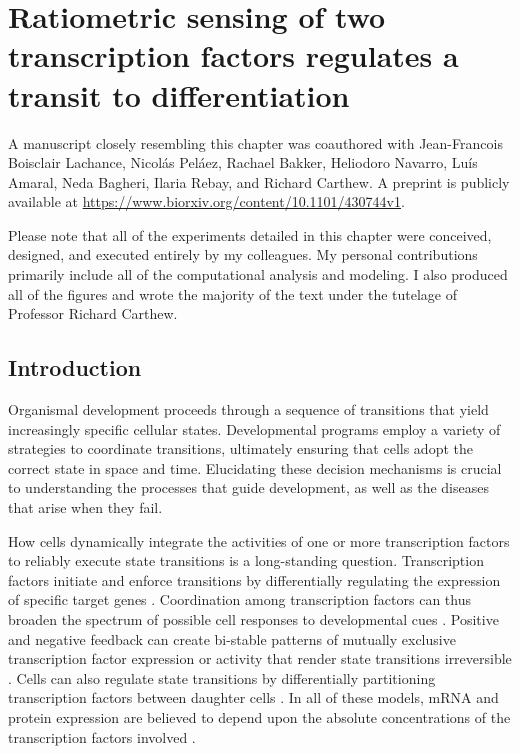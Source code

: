 \graphicspath{ {figures/ratio/} }


\chapter{Ratiometric sensing of two transcription factors regulates a transit to differentiation}
\label{ch:ratio}

A manuscript closely resembling this chapter was coauthored with Jean-Francois Boisclair Lachance, Nicol\'{a}s Pel\'{a}ez, Rachael Bakker, Heliodoro Navarro, Lu\'{i}s Amaral, Neda Bagheri, Ilaria Rebay, and Richard Carthew. A preprint is publicly available at \url{https://www.biorxiv.org/content/10.1101/430744v1}.

Please note that all of the experiments detailed in this chapter were conceived, designed, and executed entirely by my colleagues. My personal contributions primarily include all of the computational analysis and modeling. I also produced all of the figures and wrote the majority of the text under the tutelage of Professor Richard Carthew.

\section{Introduction}

Organismal development proceeds through a sequence of transitions that yield increasingly specific cellular states. Developmental programs employ a variety of strategies to coordinate transitions, ultimately ensuring that cells adopt the correct state in space and time. Elucidating these decision mechanisms is crucial to understanding the processes that guide development, as well as the diseases that arise when they fail.

How cells dynamically integrate the activities of one or more transcription factors to reliably execute state transitions is a long-standing question. Transcription factors initiate and enforce transitions by differentially regulating the expression of specific target genes \cite{Zheng1997,Ducy1997,McGhee2009}. Coordination among transcription factors can thus broaden the spectrum of possible cell responses to developmental cues \cite{ORiordan1999,Evans2003}. Positive and negative feedback can create bi-stable patterns of mutually exclusive transcription factor expression or activity that render state transitions irreversible \cite{Melen2005,Kueh2013,Yao2008,Park2012}. Cells can also regulate state transitions by differentially partitioning transcription factors between daughter cells \cite{Wolff2018}. In all of these models, mRNA and protein expression are believed to depend upon the absolute concentrations of the transcription factors involved \cite{Tontonoz1994,Laslo2006,Raj2010,Niwa2000}.

